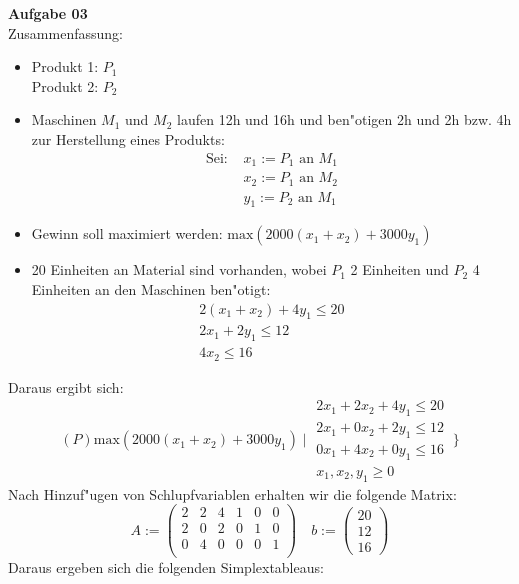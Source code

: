 \documentclass[a4paper,10pt]{article}
\begin{document}
	\parindent0pt
	\textbf{Aufgabe 03}\\
	Zusammenfassung:
	\begin{itemize}
		\item 
		Produkt 1: $P_1$\\
		Produkt 2: $P_2$
		\item Maschinen $M_1$ und $M_2$ laufen 12h und 16h und ben"otigen 2h und 2h bzw. 4h zur Herstellung eines Produkts:\\
		\begin{align*}
		\text{Sei: } & x_1 := P_1 \text{ an } M_1\\
		& x_2 := P_1 \text{ an } M_2\\
		& y_1 := P_2 \text{ an } M_1
		\end{align*}
		\item Gewinn soll maximiert werden: $\mathrm{max}(2000(x_1 + x_2) + 3000y_1)$
		\item 20 Einheiten an Material sind vorhanden, wobei $P_1$ 2 Einheiten und $P_2$ 4 Einheiten an den Maschinen ben"otigt:
		\[
		\begin{matrix}
		2(x_1 + x_2) + 4y_1 \leq 20\\
		2x_1 + 2y_1 \leq 12\\
		4x_2 \leq 16
		\end{matrix}
		\]
	\end{itemize}
	Daraus ergibt sich:
	\[
	(P) \mathrm{max}(2000(x_1 + x_2) + 3000y_1) \mid \begin{matrix}
	2x_1 + 2x_2 + 4y_1 \leq 20\\
	2x_1 + 0x_2 + 2y_1 \leq 12\\
	0x_1 + 4x_2 + 0y_1 \leq 16\\
	x_1, x_2, y_1 \geq 0
	\end{matrix}
	\
	\}
	\]
	Nach Hinzuf"ugen von Schlupfvariablen erhalten wir die folgende Matrix:
	\[
	A:=
	\begin{pmatrix}
	2 & 2 & 4 & 1 & 0 & 0\\
	2 & 0 & 2 & 0 & 1 & 0\\
	0 & 4 & 0 & 0 & 0 & 1\\
	\end{pmatrix} \quad b:= 
	\begin{pmatrix}
	20\\
	12\\
	16
	\end{pmatrix}
	\]
	Daraus ergeben sich die folgenden Simplextableaus:\\
\end{document}
